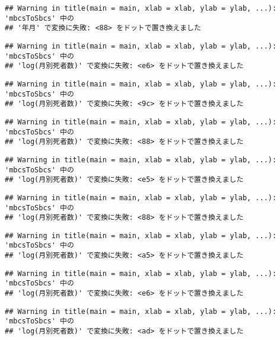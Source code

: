\documentclass[]{article}
\begin{document}
\begin{verbatim}
## Warning in title(main = main, xlab = xlab, ylab = ylab, ...): 'mbcsToSbcs' 中の
## '年月' で変換に失敗: <88> をドットで置き換えました
\end{verbatim}

\begin{verbatim}
## Warning in title(main = main, xlab = xlab, ylab = ylab, ...): 'mbcsToSbcs' 中の
## 'log(月別死者数)' で変換に失敗: <e6> をドットで置き換えました
\end{verbatim}

\begin{verbatim}
## Warning in title(main = main, xlab = xlab, ylab = ylab, ...): 'mbcsToSbcs' 中の
## 'log(月別死者数)' で変換に失敗: <9c> をドットで置き換えました
\end{verbatim}

\begin{verbatim}
## Warning in title(main = main, xlab = xlab, ylab = ylab, ...): 'mbcsToSbcs' 中の
## 'log(月別死者数)' で変換に失敗: <88> をドットで置き換えました
\end{verbatim}

\begin{verbatim}
## Warning in title(main = main, xlab = xlab, ylab = ylab, ...): 'mbcsToSbcs' 中の
## 'log(月別死者数)' で変換に失敗: <e5> をドットで置き換えました
\end{verbatim}

\begin{verbatim}
## Warning in title(main = main, xlab = xlab, ylab = ylab, ...): 'mbcsToSbcs' 中の
## 'log(月別死者数)' で変換に失敗: <88> をドットで置き換えました
\end{verbatim}

\begin{verbatim}
## Warning in title(main = main, xlab = xlab, ylab = ylab, ...): 'mbcsToSbcs' 中の
## 'log(月別死者数)' で変換に失敗: <a5> をドットで置き換えました
\end{verbatim}

\begin{verbatim}
## Warning in title(main = main, xlab = xlab, ylab = ylab, ...): 'mbcsToSbcs' 中の
## 'log(月別死者数)' で変換に失敗: <e6> をドットで置き換えました
\end{verbatim}

\begin{verbatim}
## Warning in title(main = main, xlab = xlab, ylab = ylab, ...): 'mbcsToSbcs' 中の
## 'log(月別死者数)' で変換に失敗: <ad> をドットで置き換えました
\end{verbatim}
\end{document}
